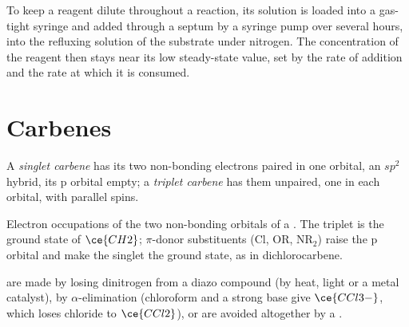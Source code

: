 \begin{inthelab}
To keep a reagent dilute throughout a reaction, its solution is loaded into a
gas-tight syringe and added through a septum by a syringe pump over several
hours, into the refluxing solution of the substrate under nitrogen. The
concentration of the reagent then stays near its low steady-state value, set by
the rate of addition and the rate at which it is consumed.
\end{inthelab}

\section{Carbenes}

\begin{definition}\label{def:b3:radicals-carbenes:carbene-states}
A \emph{singlet carbene} has its two non-bonding
electrons paired in one orbital, an $sp^2$ hybrid, its p orbital empty; a
\emph{triplet carbene} has them unpaired, one in each
orbital, with parallel spins.
\end{definition}

\begin{omfigure}

{\small Electron occupations of the two non-bonding orbitals of a . The
triplet is the ground state of $\ce{CH2}$; $\pi$-donor substituents (Cl, OR, $\mathrm{NR_2}$) raise the
p orbital and make the singlet the ground state, as in dichlorocarbene.}
\end{omfigure}

 are made by losing dinitrogen from a diazo compound (by heat, light
or a metal catalyst), by $\alpha$-elimination (chloroform and a strong base give
$\ce{CCl3-}$, which loses chloride to $\ce{CCl2}$), or are avoided altogether by a
.

